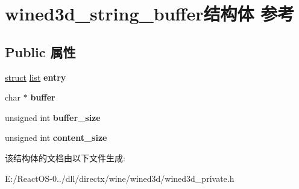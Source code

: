 \hypertarget{structwined3d__string__buffer}{}\section{wined3d\+\_\+string\+\_\+buffer结构体 参考}
\label{structwined3d__string__buffer}
\subsection*{Public 属性}
\begin{DoxyCompactItemize}
\item 
\mbox{\label{structwined3d__string__buffer_ae1b4375d74926d679edba4841d5bac3f}} 
\hyperlink{interfacestruct}{struct} \hyperlink{classlist}{list} {\bfseries entry}
\item 
\mbox{\label{structwined3d__string__buffer_a7046732817e5a17160c3526023e3b8bd}} 
char $\ast$ {\bfseries buffer}
\item 
\mbox{\label{structwined3d__string__buffer_a24cfc78bc848118cfe950bfa5bdec929}} 
unsigned int {\bfseries buffer\+\_\+size}
\item 
\mbox{\label{structwined3d__string__buffer_ab80eb2e6a339130c307507b158c8902d}} 
unsigned int {\bfseries content\+\_\+size}
\end{DoxyCompactItemize}


该结构体的文档由以下文件生成\+:\begin{DoxyCompactItemize}
\item 
E\+:/\+React\+O\+S-\/0../dll/directx/wine/wined3d/wined3d\+\_\+private.\+h\end{DoxyCompactItemize}
